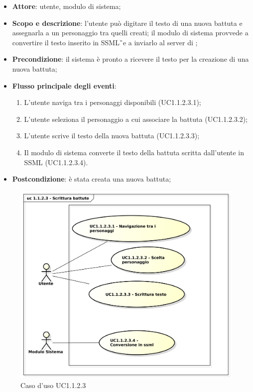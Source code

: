 \begin{itemize}
\item \textbf{Attore}: utente, modulo di sistema;
\item \textbf{Scopo e descrizione}: l'utente può digitare il testo di una nuova battuta e assegnarla a un personaggio tra quelli creati; il modulo di sistema provvede a convertire il testo inserito in SSML\G\ e a inviarlo al server di \AZIENDA; 
\item \textbf{Precondizione}: il sistema è pronto a ricevere il testo per la creazione di una nuova battuta;
\item \textbf{Flusso principale degli eventi}:
\begin{enumerate}
\item L'utente naviga tra i personaggi disponibili (UC1.1.2.3.1);
\item L'utente seleziona il personaggio a cui associare la battuta (UC1.1.2.3.2);
\item L'utente scrive il testo della nuova battuta (UC1.1.2.3.3);
\item Il modulo di sistema converte il testo della battuta scritta dall'utente in SSML (UC1.1.2.3.4).
\end{enumerate} 
\item \textbf{Postcondizione}: è stata creata una nuova battuta;
\end{itemize}
\begin{figure}[htbp]
\centering
\includegraphics[scale=0.5]{immagini/uc1_1_2_3_scrittura_battute.png}
\captionsetup{labelfont=bf}
\caption{Caso d'uso UC1.1.2.3}
\end{figure}
\newpage

